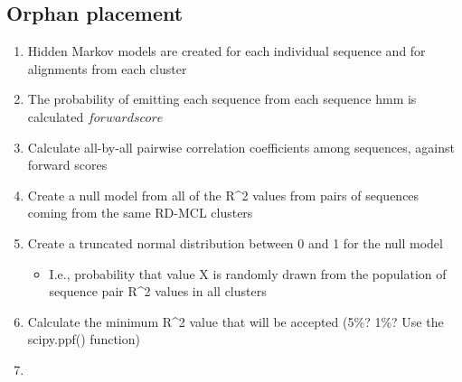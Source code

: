 \documentclass[twocolumn]{bmcart}%
\begin{document}
\subsection{Orphan placement}\label{subsec:orphanPlacement}
\begin{enumerate}
  \item Hidden Markov models are created for each individual sequence and for alignments from each cluster
  \item The probability of emitting each sequence from each sequence hmm is calculated \(forward score\)
  \item Calculate all-by-all pairwise correlation coefficients among sequences, against forward scores
  \item Create a null model from all of the R\textasciicircum2 values from pairs of sequences coming from the same RD-MCL clusters
  \item Create a truncated normal distribution between 0 and 1 for the null model
    \begin{itemize}
    \item I.e., probability that value X is randomly drawn from the population of sequence pair R\textasciicircum2 values in all clusters
    \end{itemize}
  \item Calculate the minimum R\textasciicircum2 value that will be accepted (5\%? 1\%? Use the scipy.ppf() function)
  \item
\end{enumerate}



\end{document}
